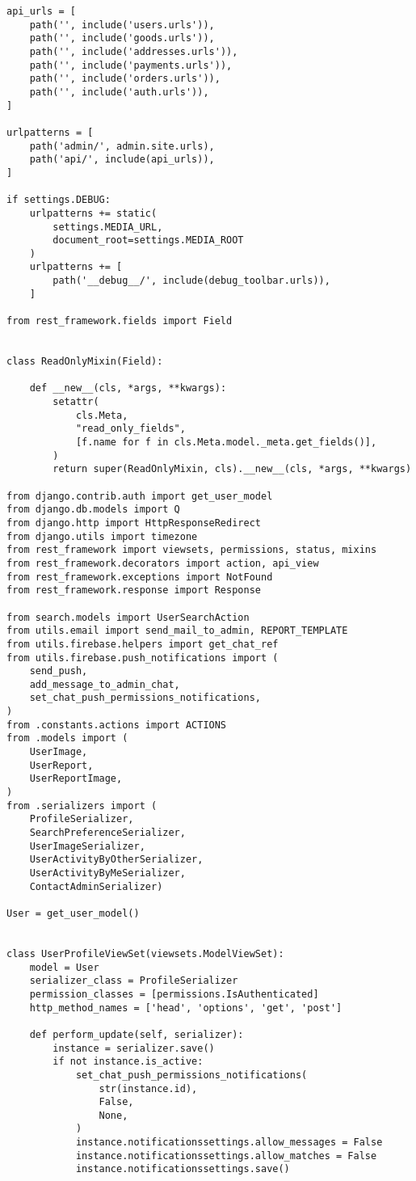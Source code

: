 \begin{lstlisting}
api_urls = [
    path('', include('users.urls')),
    path('', include('goods.urls')),
    path('', include('addresses.urls')),
    path('', include('payments.urls')),
    path('', include('orders.urls')),
    path('', include('auth.urls')),
]

urlpatterns = [
    path('admin/', admin.site.urls),
    path('api/', include(api_urls)),
]

if settings.DEBUG:
    urlpatterns += static(
        settings.MEDIA_URL,
        document_root=settings.MEDIA_ROOT
    )
    urlpatterns += [
        path('__debug__/', include(debug_toolbar.urls)),
    ]

from rest_framework.fields import Field


class ReadOnlyMixin(Field):

    def __new__(cls, *args, **kwargs):
        setattr(
            cls.Meta,
            "read_only_fields",
            [f.name for f in cls.Meta.model._meta.get_fields()],
        )
        return super(ReadOnlyMixin, cls).__new__(cls, *args, **kwargs)

from django.contrib.auth import get_user_model
from django.db.models import Q
from django.http import HttpResponseRedirect
from django.utils import timezone
from rest_framework import viewsets, permissions, status, mixins
from rest_framework.decorators import action, api_view
from rest_framework.exceptions import NotFound
from rest_framework.response import Response

from search.models import UserSearchAction
from utils.email import send_mail_to_admin, REPORT_TEMPLATE
from utils.firebase.helpers import get_chat_ref
from utils.firebase.push_notifications import (
    send_push,
    add_message_to_admin_chat,
    set_chat_push_permissions_notifications,
)
from .constants.actions import ACTIONS
from .models import (
    UserImage,
    UserReport,
    UserReportImage,
)
from .serializers import (
    ProfileSerializer,
    SearchPreferenceSerializer,
    UserImageSerializer,
    UserActivityByOtherSerializer,
    UserActivityByMeSerializer,
    ContactAdminSerializer)

User = get_user_model()


class UserProfileViewSet(viewsets.ModelViewSet):
    model = User
    serializer_class = ProfileSerializer
    permission_classes = [permissions.IsAuthenticated]
    http_method_names = ['head', 'options', 'get', 'post']

    def perform_update(self, serializer):
        instance = serializer.save()
        if not instance.is_active:
            set_chat_push_permissions_notifications(
                str(instance.id),
                False,
                None,
            )
            instance.notificationssettings.allow_messages = False
            instance.notificationssettings.allow_matches = False
            instance.notificationssettings.save()


\end{lstlisting}
